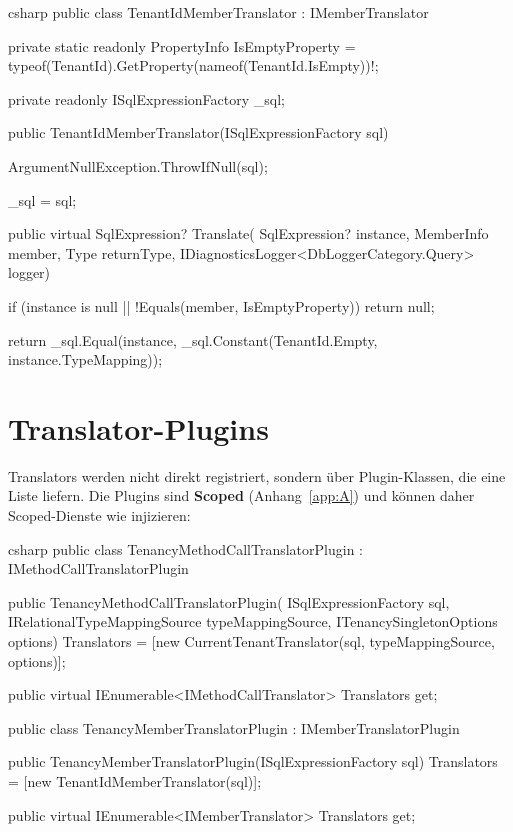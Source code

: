\begin{sourcecode}{csharp}
public class TenantIdMemberTranslator : IMemberTranslator
{
    private static readonly PropertyInfo IsEmptyProperty =
        typeof(TenantId).GetProperty(nameof(TenantId.IsEmpty))!;

    private readonly ISqlExpressionFactory _sql;

    public TenantIdMemberTranslator(ISqlExpressionFactory sql)
    {
        ArgumentNullException.ThrowIfNull(sql);

        _sql = sql;
    }

    public virtual SqlExpression? Translate(
        SqlExpression? instance, MemberInfo member, Type returnType,
        IDiagnosticsLogger<DbLoggerCategory.Query> logger)
    {
        if (instance is null || !Equals(member, IsEmptyProperty))
            return null;

        return _sql.Equal(instance, _sql.Constant(TenantId.Empty, instance.TypeMapping));
    }
}
\end{sourcecode}

\section{Translator-Plugins}

Translators werden nicht direkt registriert, sondern über Plugin-Klassen, die eine Liste
liefern. Die Plugins sind \textbf{Scoped} (Anhang~\ref{app:A}) und können daher
Scoped-Dienste wie  injizieren:

\begin{sourcecode}{csharp}
public class TenancyMethodCallTranslatorPlugin : IMethodCallTranslatorPlugin
{
    public TenancyMethodCallTranslatorPlugin(
        ISqlExpressionFactory sql,
        IRelationalTypeMappingSource typeMappingSource,
        ITenancySingletonOptions options)
    {
        Translators = [new CurrentTenantTranslator(sql, typeMappingSource, options)];
    }

    public virtual IEnumerable<IMethodCallTranslator> Translators { get; }
}

public class TenancyMemberTranslatorPlugin : IMemberTranslatorPlugin
{
    public TenancyMemberTranslatorPlugin(ISqlExpressionFactory sql)
    {
        Translators = [new TenantIdMemberTranslator(sql)];
    }

    public virtual IEnumerable<IMemberTranslator> Translators { get; }
}
\end{sourcecode}

